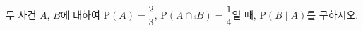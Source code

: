 두 사건 $A$, $B$에 대하여 $\mathrm{P}(A)=\dfrac{2}{3}$, $\mathrm{P}(A\cap\comp{B})=\dfrac{1}{4}$일 때, $\mathrm{P}(B\mid A)$를 구하시오.
